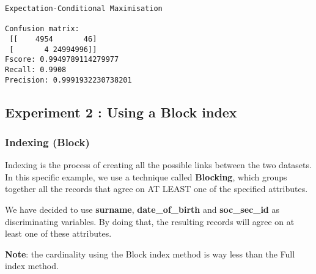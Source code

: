\documentclass{article}
\begin{document}
    \begin{Verbatim}[commandchars=\\\{\}]

\end{Verbatim}

    \begin{Verbatim}[commandchars=\\\{\}]
Expectation-Conditional Maximisation 

Confusion matrix: 
 [[    4954       46]
 [       4 24994996]]
Fscore: 0.9949789114279977
Recall: 0.9908
Precision: 0.9991932230738201

    \end{Verbatim}

    \hypertarget{experiment-2-using-a-block-index}{%
\subsection{Experiment 2 : Using a Block
index}\label{experiment-2-using-a-block-index}}

\hypertarget{indexing-block}{%
\subsubsection{Indexing (Block)}\label{indexing-block}}

Indexing is the process of creating all the possible links between the
two datasets. In this specific example, we use a technique called
\textbf{Blocking}, which groups together all the records that agree on
AT LEAST one of the specified attributes.

We have decided to use \textbf{surname}, \textbf{date\_of\_birth} and
\textbf{soc\_sec\_id} as discriminating variables. By doing that, the
resulting records will agree on at least one of these attributes.

    \textbf{Note}: the cardinality using the Block index method is way less
than the Full index method.
\end{document}
